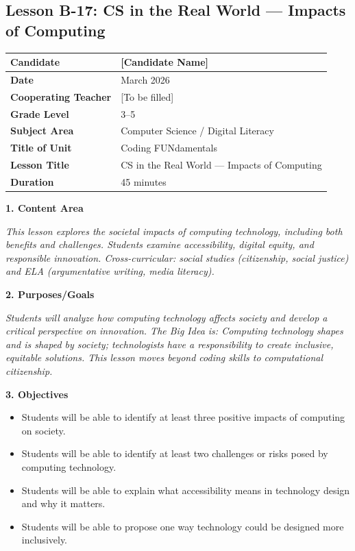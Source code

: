 \documentclass[11pt,letterpaper]{article}
\begin{document}
\newpage
\subsection{Lesson B-17: CS in the Real World --- Impacts of Computing}
\label{sub:LessonB17CSintheRealWorldImpactsofComputing}

\begin{longtable}{|L{0.28\textwidth}|L{0.65\textwidth}|}
\hline
\textbf{Candidate}  & [Candidate Name]  \\
\hline
\textbf{Date}  & March 2026  \\
\hline
\textbf{Cooperating Teacher}  & [To be filled]  \\
\hline
\textbf{Grade Level}  & 3--5  \\
\hline
\textbf{Subject Area}  & Computer Science / Digital Literacy  \\
\hline
\textbf{Title of Unit}  & Coding FUNdamentals  \\
\hline
\textbf{Lesson Title}  & CS in the Real World --- Impacts of Computing  \\
\hline
\textbf{Duration}  & 45 minutes  \\
\hline
\end{longtable}

\textbf{1. Content Area}

\textit{This lesson explores the societal impacts of computing technology, including both benefits and challenges. Students examine accessibility, digital equity, and responsible innovation. Cross-curricular: social studies (citizenship, social justice) and ELA (argumentative writing, media literacy).}

\textbf{2. Purposes/Goals}

\textit{Students will analyze how computing technology affects society and develop a critical perspective on innovation. The Big Idea is: Computing technology shapes and is shaped by society; technologists have a responsibility to create inclusive, equitable solutions. This lesson moves beyond coding skills to computational citizenship.}

\textbf{3. Objectives}

\begin{itemize}
  \item Students will be able to identify at least three positive impacts of computing on society.

  \item Students will be able to identify at least two challenges or risks posed by computing technology.

  \item Students will be able to explain what accessibility means in technology design and why it matters.

  \item Students will be able to propose one way technology could be designed more inclusively.
\end{itemize}
\end{document}
